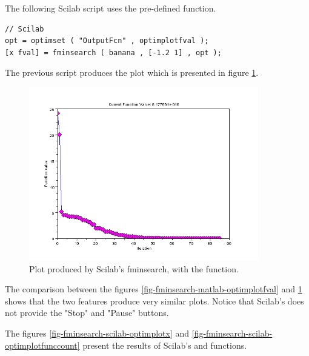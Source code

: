The following Scilab script uses the 
pre-defined function.

\lstset{language=scilabscript}
\begin{lstlisting}
// Scilab
opt = optimset ( "OutputFcn" , optimplotfval );
[x fval] = fminsearch ( banana , [-1.2 1] , opt );
\end{lstlisting}

The previous script produces the plot which is presented in figure 
\ref{fig-fminsearch-scilab-optimplotfval}.

\begin{figure}
\begin{center}
\includegraphics[width=10cm]{testFminsearchOptimplotfvalScilab.png}
\end{center}
\caption{Plot produced by Scilab's fminsearch, with the  function.}
\label{fig-fminsearch-scilab-optimplotfval}
\end{figure}

The comparison between the figures \ref{fig-fminsearch-matlab-optimplotfval} and 
\ref{fig-fminsearch-scilab-optimplotfval} shows that the two features produce
very similar plots. Notice that Scilab's  does not 
provide the "Stop" and "Pause" buttons.

The figures \ref{fig-fminsearch-scilab-optimplotx} and \ref{fig-fminsearch-scilab-optimplotfunccount}
present the results of Scilab's  and 
functions.

